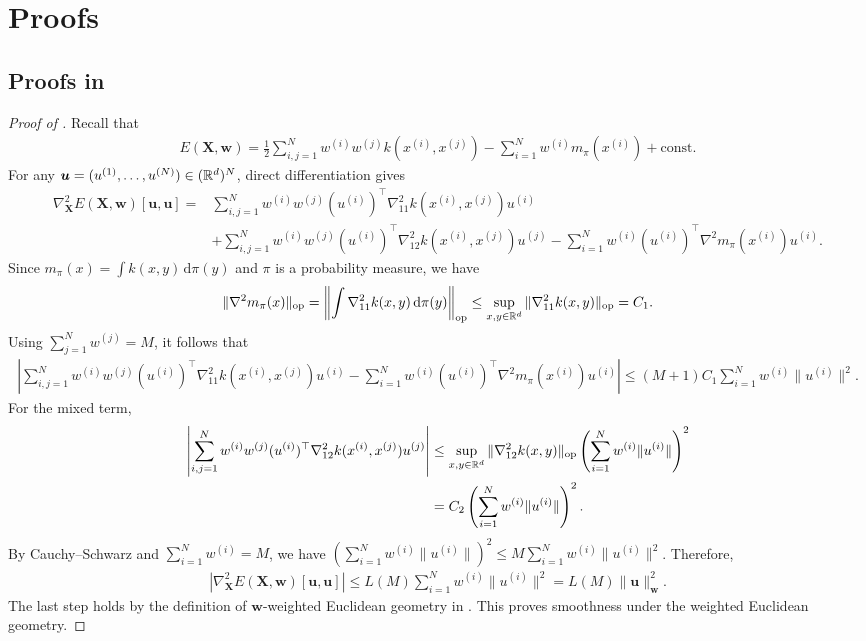 \section{Proofs}
\subsection{Proofs in }
\begin{proof}[Proof of ]
Recall that
\begin{align*}
E(\bm{X},\bm{w})
=
\frac{1}{2}\sum_{i,j=1}^N w^{(i)}w^{(j)} k(x^{(i)},x^{(j)})
-
\sum_{i=1}^N w^{(i)} m_\pi(x^{(i)})
+
\mathrm{const}.
\end{align*}
For any $\bm{u}=(u^{(1)},\ldots,u^{(N)})\in(\mathbb{R}^d)^N$, direct differentiation gives
\begin{align*}
\nabla_{\bm{X}}^2E(\bm{X},\bm{w})[\bm{u},\bm{u}]
={}&
\sum_{i,j=1}^N
w^{(i)}w^{(j)}
(u^{(i)})^\top\nabla_{11}^2 k(x^{(i)},x^{(j)})u^{(i)}
\\
&+
\sum_{i,j=1}^N
w^{(i)}w^{(j)}
(u^{(i)})^\top\nabla_{12}^2 k(x^{(i)},x^{(j)})u^{(j)}
-
\sum_{i=1}^N
w^{(i)}
(u^{(i)})^\top\nabla^2m_\pi(x^{(i)})u^{(i)}.
\end{align*}
Since $m_\pi(x)=\int k(x,y)\,\mathrm{d}\pi(y)$ and $\pi$ is a probability measure, we have
\begin{align*}
\|\nabla^2m_\pi(x)\|_{\mathrm{op}}
=
\left\|
\int\nabla_{11}^2 k(x,y)\,\mathrm{d}\pi(y)
\right\|_{\mathrm{op}}
\leq
\sup_{x,y\in\mathbb{R}^d}
\|\nabla_{11}^2 k(x,y)\|_{\mathrm{op}} = C_1.
\end{align*}
Using $\sum_{j=1}^Nw^{(j)}=M$, it follows that
\begin{align*}
\left|
\sum_{i,j=1}^N w^{(i)} w^{(j)} (u^{(i)})^\top\nabla_{11}^2 k(x^{(i)},x^{(j)})u^{(i)} - \sum_{i=1}^N w^{(i)} (u^{(i)})^\top\nabla^2m_\pi(x^{(i)})u^{(i)}
\right| \leq (M+1) C_1
\sum_{i=1}^Nw^{(i)}\|u^{(i)}\|^2.
\end{align*}
For the mixed term,
\begin{align*}
\left|
\sum_{i,j=1}^N
w^{(i)}w^{(j)}
(u^{(i)})^\top\nabla_{12}^2 k(x^{(i)},x^{(j)})u^{(j)}
\right|
&\leq
\sup_{x,y\in\mathbb{R}^d}
\|\nabla_{12}^2 k(x,y)\|_{\mathrm{op}}
\left(\sum_{i=1}^Nw^{(i)}\|u^{(i)}\|\right)^2 \\
&= C_2 \left(\sum_{i=1}^Nw^{(i)}\|u^{(i)}\|\right)^2 .
\end{align*}
By Cauchy--Schwarz and $\sum_{i=1}^Nw^{(i)}=M$, we have
$\left(\sum_{i=1}^N w^{(i)}\|u^{(i)}\|\right)^2
\leq M\sum_{i=1}^Nw^{(i)}\|u^{(i)}\|^2$. Therefore,
\begin{align*}
\left|
\nabla_{\bm{X}}^2 E(\bm{X},\bm{w})[\bm{u},\bm{u}]
\right| \leq L(M) \sum_{i=1}^N w^{(i)}\|u^{(i)}\|^2 = L(M) \|\bm{u}\|_{\bm{w}}^2.
\end{align*}
The last step holds by the definition of $\bm{w}$-weighted Euclidean geometry in . 
This proves smoothness under the weighted Euclidean geometry.


\end{proof}
